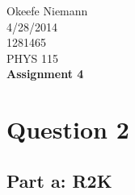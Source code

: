 \documentclass[10pt]{article}
\begin{document}
 
\begin{center}
\large
\hfill Okeefe Niemann\\
\hfill 4/28/2014\\
\hfill 1281465\\
\hfill PHYS 115 \\
\LARGE \textbf{Assignment 4}\\
\end{center}
\normalsize
\section*{Question 2}
\subsection*{Part a: R2K}
\end{document}
